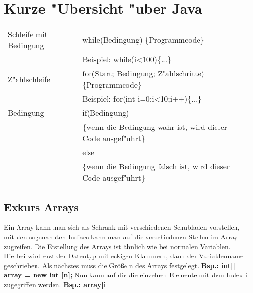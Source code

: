 \section{Kurze "Ubersicht "uber Java}
	\begin{table}[H]
		\renewcommand{\arraystretch}{1.5}
		\begin{center}
			\begin{tabular}{|p{}|p{}|}
				\hline
				Schleife mit Bedingung& while(Bedingung) \{Programmcode\} \tabularnewline
				\space & \scriptsize Beispiel: while(i<100)\{...\} \tabularnewline
				\hline
				Z"ahlschleife& for(Start; Bedingung; Z"ahlschritte) \{Programmcode\} \tabularnewline
				\space & \scriptsize Beispiel: for(int i=0;i<10;i++)\{...\} \tabularnewline
				\hline
				Bedingung& if(Bedingung) \tabularnewline
				\space& \{wenn die Bedingung wahr ist, wird dieser Code ausgef"uhrt\} \tabularnewline
				\space & else \tabularnewline
				\space & \{wenn die Bedingung falsch ist, wird dieser Code ausgef"uhrt\}
				\tabularnewline
				\hline			
			\end{tabular}
		\end{center}
	\end{table}

\subsection{Exkurs Arrays}
Ein Array kann man sich als Schrank mit verschiedenen Schubladen vorstellen, mit den sogenannten Indizes kann man auf die verschiedenen Stellen im Array zugreifen. \newline
Die Erstellung des Arrays ist \"ahnlich wie bei normalen Variablen. Hierbei wird erst der Datentyp mit eckigen Klammern, dann der Variablenname geschrieben. Als n\"achstes muss die Gr\"o\ss{}e n des Arrays festgelegt. \textbf{Bsp.: int[] array = new int [n];} \newline
Nun kann auf die die einzelnen Elemente mit dem Index i zugegriffen werden. \textbf{Bsp.: array[i]}
	